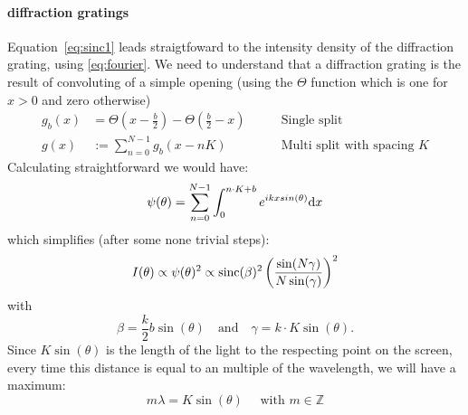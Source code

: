 \paragraph{diffraction gratings} 
Equation~\eqref{eq:sinc1} leads straigtfoward to the intensity density of
the diffraction grating, using \eqref{eq:fourier}. We need to understand 
that a diffraction grating is the result of convoluting of a simple opening
(using the $\Theta$ function which is one for $x>0$ and zero otherwise)
\begin{align}
    \label{eq:multisplit}
    g_b(x) &= \Theta(x - \frac{b}{2}) - \Theta( \frac{b}{2} - x ) \qquad
           &\text{Single split} \\ 
   g(x)   &:= \sum_{n=0}^{N-1} g_b(x-nK) 
         \qquad &\text{Multi split with spacing } K
\end{align}
Calculating straightforward we would have:
\begin{equation}
    \psi(\theta) = \sum_{n = 0}^{N-1}  \int^{n \cdot K + b}_{0} e^{i k x sin(\theta)} \mathrm{d} x
\end{equation}
which simplifies (after some none trivial steps):
\begin{equation}
    I(\theta) \propto \psi(\theta)^2 \propto \mathrm{sinc}(\beta)^2 \left (\frac{\sin(N\gamma)}{N \sin(\gamma)}\right )^2
\end{equation}
with
\begin{equation}
    \beta = \frac{k}{2}b \sin(\theta) \quad \text{and} \quad \gamma = k\cdot K \sin(\theta).
\end{equation}
Since $K \sin (\theta)$ is the length of the light to the respecting point on the screen, every time
this distance is equal to an multiple of the wavelength, we will have a maximum:
\begin{equation}
    m \lambda = K \sin(\theta) \quad \text{ with }m \in \mathbb{Z}
    \label{eq:N_lines_interference}
\end{equation}
\clearpage
